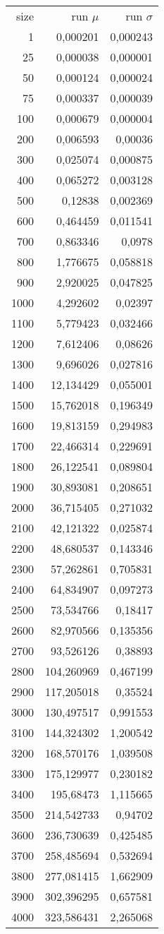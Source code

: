\begin{tabular}{r r r}
size & run $\mu$ & run $\sigma$ \\
1 & 0,000201 & 0,000243 \\
25 & 0,000038 & 0,000001 \\
50 & 0,000124 & 0,000024 \\
75 & 0,000337 & 0,000039 \\
100 & 0,000679 & 0,000004 \\
200 & 0,006593 & 0,00036 \\
300 & 0,025074 & 0,000875 \\
400 & 0,065272 & 0,003128 \\
500 & 0,12838 & 0,002369 \\
600 & 0,464459 & 0,011541 \\
700 & 0,863346 & 0,0978 \\
800 & 1,776675 & 0,058818 \\
900 & 2,920025 & 0,047825 \\
1000 & 4,292602 & 0,02397 \\
1100 & 5,779423 & 0,032466 \\
1200 & 7,612406 & 0,08626 \\
1300 & 9,696026 & 0,027816 \\
1400 & 12,134429 & 0,055001 \\
1500 & 15,762018 & 0,196349 \\
1600 & 19,813159 & 0,294983 \\
1700 & 22,466314 & 0,229691 \\
1800 & 26,122541 & 0,089804 \\
1900 & 30,893081 & 0,208651 \\
2000 & 36,715405 & 0,271032 \\
2100 & 42,121322 & 0,025874 \\
2200 & 48,680537 & 0,143346 \\
2300 & 57,262861 & 0,705831 \\
2400 & 64,834907 & 0,097273 \\
2500 & 73,534766 & 0,18417 \\
2600 & 82,970566 & 0,135356 \\
2700 & 93,526126 & 0,38893 \\
2800 & 104,260969 & 0,467199 \\
2900 & 117,205018 & 0,35524 \\
3000 & 130,497517 & 0,991553 \\
3100 & 144,324302 & 1,200542 \\
3200 & 168,570176 & 1,039508 \\
3300 & 175,129977 & 0,230182 \\
3400 & 195,68473 & 1,115665 \\
3500 & 214,542733 & 0,94702 \\
3600 & 236,730639 & 0,425485 \\
3700 & 258,485694 & 0,532694 \\
3800 & 277,081415 & 1,662909 \\
3900 & 302,396295 & 0,657581 \\
4000 & 323,586431 & 2,265068 \\
\end{tabular}

